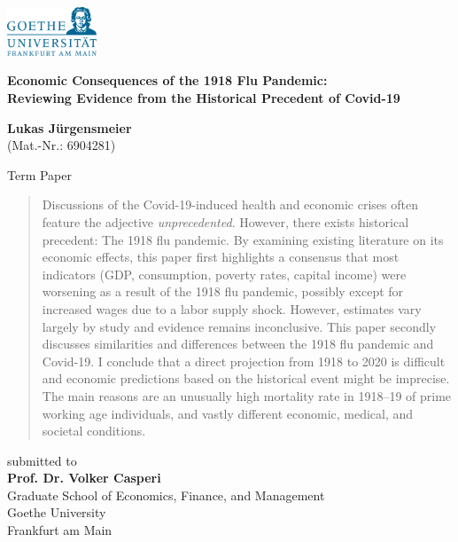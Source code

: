 \documentclass[12pt,a4paper]{article}
\begin{document}

\begin{center}
 \includegraphics[width=0.2\textwidth]{external/GU-Logo-blau-CMYK.eps} \vspace{1.5cm}
  
{\large{\bf Economic Consequences of the 1918 Flu Pandemic:\\
		Reviewing Evidence from the Historical Precedent of Covid-19}}

\textbf{Lukas J\"urgensmeier} \\
{\footnotesize (Mat.-Nr.: 6904281)}

  Term Paper \\\vspace{1.5cm}
  
  \begin{abstract}
  	Discussions of the Covid-19-induced health and economic crises often feature the adjective \textit{unprecedented}.
  	However, there exists historical precedent: The 1918 flu pandemic.
  	By examining existing literature on its economic effects, this paper first highlights a consensus that most indicators (GDP, consumption, poverty rates, capital income) were worsening as a result of the 1918 flu pandemic, possibly except for increased wages due to a labor supply shock.
  	However, estimates vary largely by study and evidence remains inconclusive.
  	This paper secondly discusses similarities and differences between the 1918 flu pandemic and Covid-19.
  	I conclude that a direct projection from 1918 to 2020 is difficult and economic predictions based on the historical event might be imprecise.
  	The main reasons are an unusually high mortality rate in 1918--19 of prime working age individuals, and vastly different economic, medical, and societal conditions.
  	
  \end{abstract} \vspace{1.5cm}
  
  submitted to \\\vspace{0.5cm}
  \textbf{Prof. Dr. Volker Casperi} \\
  Graduate School of Economics, Finance, and Management \\
  Goethe University \\
  Frankfurt am Main \vspace{1.5cm}
  

\end{center}
\end{document}
